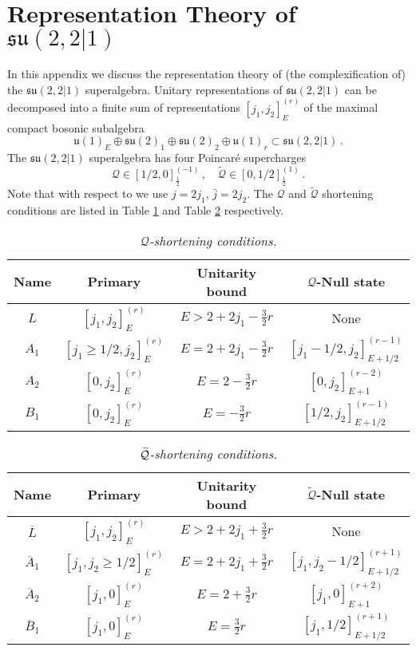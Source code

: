 \documentclass[main.tex]{subfiles}
\begin{document}
\section{Representation Theory of \texorpdfstring{$\mathfrak{su}(2,2|1)$}{su(2,2|1)}}\label{app:SCAreps}
In this appendix we discuss the representation theory of (the complexification of) the $\mathfrak{su}(2,2|1)$ superalgebra. Unitary representations of $\mathfrak{su}(2,2|1)$ can be decomposed into a finite sum of representations $[j_1,j_2]_E^{(r)}$ of the maximal compact bosonic subalgebra
\begin{equation}
\mathfrak{u}(1)_E\oplus \mathfrak{su}(2)_1\oplus\mathfrak{su}(2)_2\oplus \mathfrak{u}(1)_{r}\subset\mathfrak{su}(2,2|1)\,.
\end{equation}
The $\mathfrak{su}(2,2|1)$ superalgebra has four Poincar\'e supercharges 
\begin{equation}
\mathcal{Q}\in[1/2,0]_{\frac{1}{2}}^{(-1)}\,,\quad \widetilde{\mathcal{Q}}\in[0,1/2]^{(1)}_{\frac{1}{2}}\,.
\end{equation}
Note that with respect to \cite{Cordova:2016emh} we use $j=2j_1$, $\bar{j}=2j_2$. The $\mathcal{Q}$ and $\widetilde{\mathcal{Q}}$ shortening conditions are listed in Table \ref{tab:Qshort} and Table \ref{tab:Qtilshort} respectively. 
\begin{table}
\centering
\begin{tabular}{|c|c|c|c|}
\hline
Name&Primary&Unitarity bound& $\mathcal{Q}$-Null state\\\hline
$L$&$[j_1,j_2]_{E}^{(r)}$&$E>2+2j_1-\frac{3}{2}r$&None\\\hline
$A_1$&$[j_1\geq1/2,j_2]_{E}^{(r)}$&$E=2+2j_1-\frac{3}{2}r$&$[j_1-1/2,j_2]_{E+1/2}^{(r-1)}$\\\hline
$A_2$&$[0,j_2]_{E}^{(r)}$&$E=2-\frac{3}{2}r$&$[0,j_2]_{E+1}^{(r-2)}$\\\hline
$B_1$&$[0,j_2]_{E}^{(r)}$&$E=-\frac{3}{2}r$&$[1/2,j_2]_{E+1/2}^{(r-1)}$\\\hline
\end{tabular}
\caption{\textit{$\mathcal{Q}$-shortening conditions.}}
\label{tab:Qshort}
\end{table}
\begin{table}
\centering
\begin{tabular}{|c|c|c|c|}
\hline
Name&Primary&Unitarity bound& $\widetilde{\mathcal{Q}}$-Null state\\\hline
$\overline{L}$&$[j_1,j_2]_{E}^{(r)}$&$E>2+2j_1+\frac{3}{2}r$&None\\\hline
$\overline{A}_1$&$[j_1,j_2\geq1/2]_{E}^{(r)}$&$E=2+2j_1+\frac{3}{2}r$&$[j_1,j_2-1/2]_{E+1/2}^{(r+1)}$\\\hline
$\overline{A}_2$&$[j_1,0]_{E}^{(r)}$&$E=2+\frac{3}{2}r$&$[j_1,0]_{E+1}^{(r+2)}$\\\hline
$\overline{B}_1$&$[j_1,0]_{E}^{(r)}$&$E=\frac{3}{2}r$&$[j_1,1/2]_{E+1/2}^{(r+1)}$\\\hline
\end{tabular}
\caption{\textit{$\widetilde{\mathcal{Q}}$-shortening conditions.}}
\label{tab:Qtilshort}
\end{table}
\end{document}

